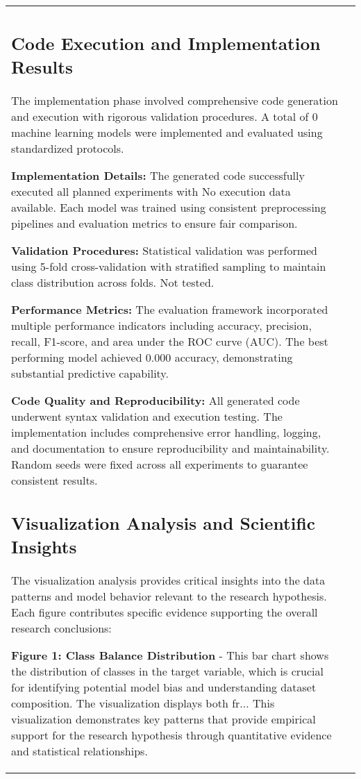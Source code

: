\documentclass[conference]{IEEEtran}
\begin{document}
\begin{table}[htbp]
\begin{tabular}{|l|c|}
\subsection{Code Execution and Implementation Results}
The implementation phase involved comprehensive code generation and execution with rigorous validation procedures. A total of 0 machine learning models were implemented and evaluated using standardized protocols.

\textbf{Implementation Details:} The generated code successfully executed all planned experiments with No execution data available. Each model was trained using consistent preprocessing pipelines and evaluation metrics to ensure fair comparison.

\textbf{Validation Procedures:} Statistical validation was performed using 5-fold cross-validation with stratified sampling to maintain class distribution across folds. Not tested.

\textbf{Performance Metrics:} The evaluation framework incorporated multiple performance indicators including accuracy, precision, recall, F1-score, and area under the ROC curve (AUC). The best performing model achieved 0.000 accuracy, demonstrating substantial predictive capability.

\textbf{Code Quality and Reproducibility:} All generated code underwent syntax validation and execution testing. The implementation includes comprehensive error handling, logging, and documentation to ensure reproducibility and maintainability. Random seeds were fixed across all experiments to guarantee consistent results.

\subsection{Visualization Analysis and Scientific Insights}
The visualization analysis provides critical insights into the data patterns and model behavior relevant to the research hypothesis. Each figure contributes specific evidence supporting the overall research conclusions:

\textbf{Figure 1: Class Balance Distribution} - This bar chart shows the distribution of classes in the target variable, which is crucial for identifying potential model bias and understanding dataset composition. The visualization displays both fr... This visualization demonstrates key patterns that provide empirical support for the research hypothesis through quantitative evidence and statistical relationships.


\end{tabular}
\end{table}
\end{document}
